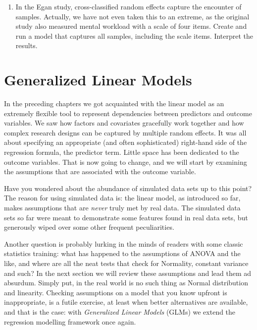 \documentclass[]{svmono}
\providecommand{\tightlist}{%
  \setlength{\itemsep}{0pt}\setlength{\parskip}{0pt}}
\begin{document}
\begin{enumerate}
\def\labelenumi{\arabic{enumi}.}
\tightlist
\item
  In the Egan study, cross-classified random effects capture the
  encounter of samples. Actually, we have not even taken this to an
  extreme, as the original study also measured mental workload with a
  scale of four items. Create and run a model that captures all samples,
  including the scale items. Interpret the results.
\end{enumerate}

\chapter{Generalized Linear Models}\label{GLM}

In the preceding chapters we got acquainted with the linear model as an
extremely flexible tool to represent dependencies between predictors and
outcome variables. We saw how factors and covariates gracefully work
together and how complex research designs can be captured by multiple
random effects. It was all about specifying an appropriate (and often
sophisticated) right-hand side of the regression formula, the predictor
term. Little space has been dedicated to the outcome variables. That is
now going to change, and we will start by examining the assumptions that
are associated with the outcome variable.

Have you wondered about the abundance of simulated data sets up to this
point? The reason for using simulated data is: the linear model, as
introduced so far, makes assumptions that are \emph{never} truly met by
real data. The simulated data sets so far were meant to demonstrate some
features found in real data sets, but generously wiped over some other
frequent peculiarities.

Another question is probably lurking in the minds of readers with some
classic statistics training: what has happened to the assumptions of
ANOVA and the like, and where are all the neat tests that check for
Normality, constant variance and such? In the next section we will
review these assumptions and lead them ad absurdum. Simply put, in the
real world is no such thing as Normal distribution and linearity.
Checking assumptions on a model that you know upfront is inappropriate,
is a futile exercise, at least when better alternatives are available,
and that is the case: with \emph{Generalized Linear Models} (GLMs) we
extend the regression modelling framework once again.
\end{document}
